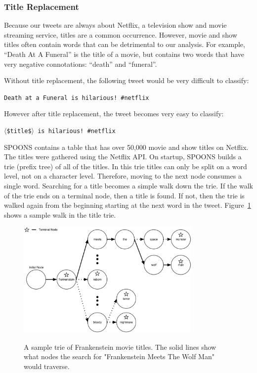 \documentclass[12pt]{ucthesis}
\newcommand{\captionfonts}{\small\bf\ssp}
\begin{document}
\subsubsection{Title Replacement}
\label{class-filter-title}
Because our tweets are always about Netflix, a television show and movie streaming service,
titles are a common occurrence. However, movie and show titles often contain words that can be
detrimental to our analysis. For example, ``Death At A Funeral'' is the title of a movie, but contains
two words that have very negative connotations: ``death'' and ``funeral''.

Without title replacement, the following tweet would be very difficult to classify:

\begin{center}
   \texttt{Death at a Funeral is hilarious!  \#netflix}
\end{center}

However after title replacement, the tweet becomes very easy to classify:

\begin{center}
   \texttt{$\langle$\$title\$$\rangle$ is hilarious!  \#netflix}
\end{center}

SPOONS contains a table that has over 50,000 movie and show titles on Netflix. The titles were gathered
using the Netflix API. On startup, SPOONS builds a trie (prefix tree)\cite{trie} of all of the titles. In this trie titles can
only be split on a word level, not on a character level. Therefore, moving to the next node consumes a single word.
Searching for a title becomes a simple walk down the trie.
If the walk of the trie ends on a terminal node, then a title is found. If not, then the trie is walked again from the beginning
starting at the next word in the tweet. Figure~\ref{fig:title-trie} shows a sample walk in the title trie.

\begin{figure}
   \begin{center}
      \includegraphics[width=0.8\textwidth]{images/Title_Trie.eps}
      \captionfonts
      \caption[Title Trie Walk]{A sample trie of Frankenstein movie titles. The solid lines show what nodes the search for "Frankenstein Meets The Wolf Man" would traverse.}
      \label{fig:title-trie}
   \end{center}
\end{figure}
\end{document}
